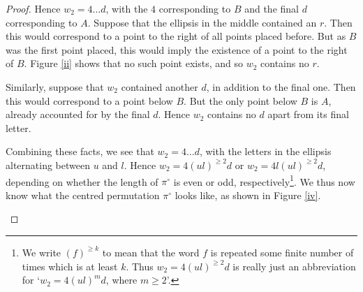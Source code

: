 \documentclass[11pt,a4paper]{article}
\newcommand{\plotptradius}{4pt}
\theoremstyle{definition}
\begin{document}
\begin{proof}
Hence $w_{2} = 4 \dots d$, with the $4$ corresponding to $B$ and the final $d$ corresponding to $A$. Suppose that the ellipsis in the middle contained an $r$. Then this would correspond to a point to the right of all points placed before. But as $B$ was the first point placed, this would imply the existence of a point to the right of $B$. Figure \ref{ii} shows that no such point exists, and so $w_{2}$ contains no $r$.

Similarly, suppose that $w_{2}$ contained another $d$, in addition to the final one. Then this would correspond to a point below $B$. But the only point below $B$ is $A$, already accounted for by the final $d$. Hence $w_{2}$ contains no $d$ apart from its final letter.

Combining these facts, we see that $w_{2} = 4 \dots d$, with the letters in the ellipsis alternating between $u$ and $l$. Hence $w_{2} = 4(ul)^{\geq2}d$ or $w_{2} = 4l(ul)^{\geq2}d$, depending on whether the length of $\pi^{\circ}$ is even or odd, respectively\footnote{We write $(f)^{\geq k}$ to mean that the word $f$ is repeated some finite number of times which is at least $k$. Thus $w_{2} = 4(ul)^{\geq2}d$ is really just an abbreviation for `$w_{2}=4(ul)^{m}d$, where $m \geq 2$'.}. We thus now know what the centred permutation $\pi^{\circ}$ looks like, as shown in Figure \ref{iv}.


\begin{figure}[h]
\begin{center}
\end{center}
\end{figure}
\end{proof}
\end{document}
